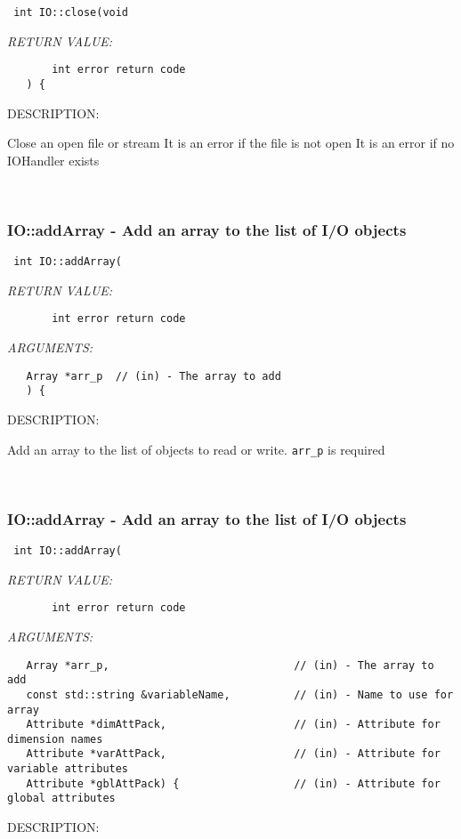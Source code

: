   
\begin{verbatim} int IO::close(void\end{verbatim}{\em RETURN VALUE:}
\begin{verbatim}       int error return code
   ) {\end{verbatim}
{\sf DESCRIPTION:\\ }


        Close an open file or stream
        It is an error if the file is not open
        It is an error if no IOHandler exists
   
 
\mbox{}\hrulefill\ 
 
\subsubsection [IO::addArray] {IO::addArray - Add an array to the list of I/O objects}


  
\begin{verbatim} int IO::addArray(\end{verbatim}{\em RETURN VALUE:}
\begin{verbatim}       int error return code\end{verbatim}{\em ARGUMENTS:}
\begin{verbatim}   Array *arr_p  // (in) - The array to add
   ) {\end{verbatim}
{\sf DESCRIPTION:\\ }


        Add an array to the list of objects to read or write.
        {\tt arr_p} is required
   
 
\mbox{}\hrulefill\ 
 
\subsubsection [IO::addArray] {IO::addArray - Add an array to the list of I/O objects}


  
\begin{verbatim} int IO::addArray(\end{verbatim}{\em RETURN VALUE:}
\begin{verbatim}       int error return code\end{verbatim}{\em ARGUMENTS:}
\begin{verbatim}   Array *arr_p,                             // (in) - The array to add
   const std::string &variableName,          // (in) - Name to use for array
   Attribute *dimAttPack,                    // (in) - Attribute for dimension names
   Attribute *varAttPack,                    // (in) - Attribute for variable attributes
   Attribute *gblAttPack) {                  // (in) - Attribute for global attributes\end{verbatim}
{\sf DESCRIPTION:\\ }


